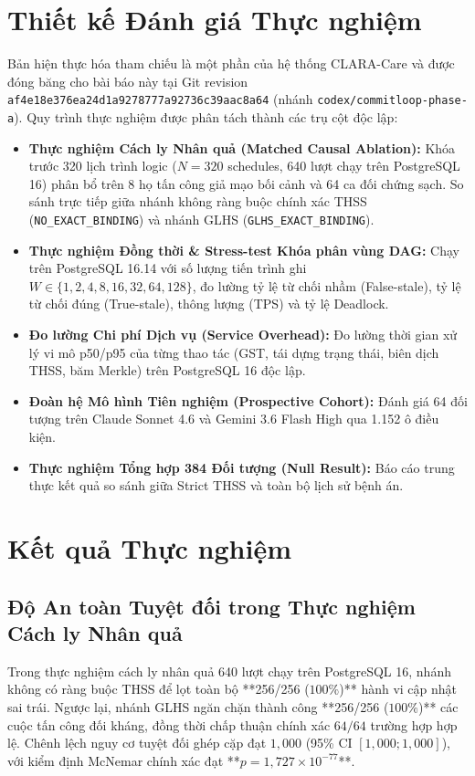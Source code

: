 \documentclass[11pt]{article}
\begin{document}
\section{Thiết kế Đánh giá Thực nghiệm}
Bản hiện thực hóa tham chiếu là một phần của hệ thống CLARA-Care và được đóng băng cho bài báo này tại Git revision \nolinkurl{af4e18e376ea24d1a9278777a92736c39aac8a64} (nhánh \texttt{codex/commitloop-phase-a}). Quy trình thực nghiệm được phân tách thành các trụ cột độc lập:
\begin{itemize}
    \item \textbf{Thực nghiệm Cách ly Nhân quả (Matched Causal Ablation):} Khóa trước 320 lịch trình logic ($N=320$ schedules, 640 lượt chạy trên PostgreSQL 16) phân bổ trên 8 họ tấn công giả mạo bối cảnh và 64 ca đối chứng sạch. So sánh trực tiếp giữa nhánh không ràng buộc chính xác THSS (\texttt{NO\_EXACT\_BINDING}) và nhánh GLHS (\texttt{GLHS\_EXACT\_BINDING}).
    \item \textbf{Thực nghiệm Đồng thời \& Stress-test Khóa phân vùng DAG:} Chạy trên PostgreSQL 16.14 với số lượng tiến trình ghi $W \in \{1, 2, 4, 8, 16, 32, 64, 128\}$, đo lường tỷ lệ từ chối nhầm (False-stale), tỷ lệ từ chối đúng (True-stale), thông lượng (TPS) và tỷ lệ Deadlock.
    \item \textbf{Đo lường Chi phí Dịch vụ (Service Overhead):} Đo lường thời gian xử lý vi mô p50/p95 của từng thao tác (GST, tái dựng trạng thái, biên dịch THSS, băm Merkle) trên PostgreSQL 16 độc lập.
    \item \textbf{Đoàn hệ Mô hình Tiên nghiệm (Prospective Cohort):} Đánh giá 64 đối tượng trên Claude Sonnet 4.6 và Gemini 3.6 Flash High qua 1.152 ô điều kiện.
    \item \textbf{Thực nghiệm Tổng hợp 384 Đối tượng (Null Result):} Báo cáo trung thực kết quả so sánh giữa Strict THSS và toàn bộ lịch sử bệnh án.
\end{itemize}

\section{Kết quả Thực nghiệm}

\subsection{Độ An toàn Tuyệt đối trong Thực nghiệm Cách ly Nhân quả}
Trong thực nghiệm cách ly nhân quả 640 lượt chạy trên PostgreSQL 16, nhánh không có ràng buộc THSS để lọt toàn bộ **256/256 ($100\%$)** hành vi cập nhật sai trái. Ngược lại, nhánh GLHS ngăn chặn thành công **256/256 ($100\%$)** các cuộc tấn công đối kháng, đồng thời chấp thuận chính xác $64/64$ trường hợp hợp lệ. Chênh lệch nguy cơ tuyệt đối ghép cặp đạt $1{,}000$ (95\% CI $[1{,}000; 1{,}000]$), với kiểm định McNemar chính xác đạt **$p = 1{,}727 \times 10^{-77}$**.
\end{document}

